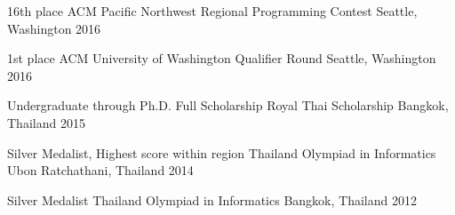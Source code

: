
\begin{cvhonors}
  \cvhonor
    {16th place} %
    {ACM Pacific Northwest Regional Programming Contest} %
    {Seattle, Washington} %
    {2016} %

  \cvhonor
    {1st place} %
    {ACM University of Washington Qualifier Round} %
    {Seattle, Washington} %
    {2016} %

  \cvhonor
    {Undergraduate through Ph.D. Full Scholarship} %
    {Royal Thai Scholarship} %
    {Bangkok, Thailand} %
    {2015} %

  \cvhonor
    {Silver Medalist, Highest score within region} %
    {Thailand Olympiad in Informatics} %
    {Ubon Ratchathani, Thailand} %
    {2014} %

  \cvhonor
    {Silver Medalist} %
    {Thailand Olympiad in Informatics} %
    {Bangkok, Thailand} %
    {2012} %

\end{cvhonors}
